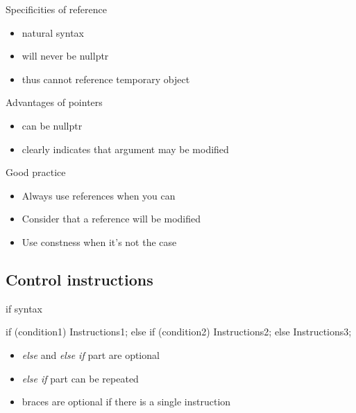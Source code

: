 \begin{frame}[fragile]
  \begin{block}{Specificities of reference}
    \begin{itemize}
    \item natural syntax
    \item will never be {\ttfamily nullptr}
    \item thus cannot reference temporary object
    \end{itemize}
  \end{block}
  \begin{block}{Advantages of pointers}
    \begin{itemize}
    \item can be {\ttfamily nullptr}
    \item clearly indicates that argument may be modified
    \end{itemize}
  \end{block}
  \pause
  \begin{alertblock}{Good practice}
    \begin{itemize}
      \item Always use references when you can
      \item Consider that a reference will be modified
      \item Use constness when it's not the case
    \end{itemize}
  \end{alertblock}
\end{frame}

\subsection[Control]{Control instructions}

\begin{frame}[fragile]
  \begin{block}{if syntax}
    \begin{cppcode*}{}
      if (condition1) {
        Instructions1;
      } else if (condition2) {
        Instructions2;
      } else {
        Instructions3;
      }
    \end{cppcode*}
    \begin{itemize}
      \item {\it else} and {\it else if} part are optional
      \item {\it else if} part can be repeated
      \item braces are optional if there is a single instruction
    \end{itemize}
  \end{block}
\end{frame}

